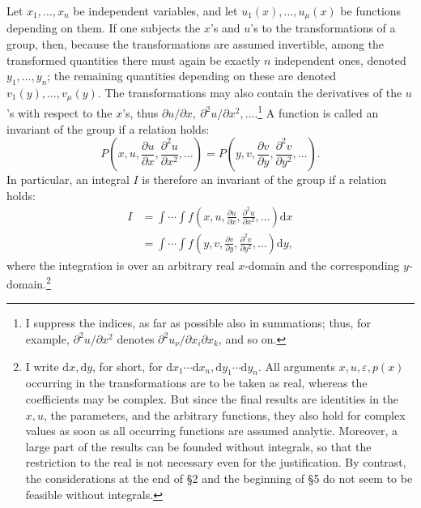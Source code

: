 \documentclass[11pt]{article}
\providecommand{\eps}{\varepsilon}
\providecommand{\dd}{\mathrm d}
\providecommand{\p}{\partial}
\begin{document}
Let \(x_1,\ldots,x_n\) be independent variables, and let \(u_1(x),\ldots,u_\mu(x)\) be functions depending on them. If one subjects the \(x\)'s and \(u\)'s to the transformations of a group, then, because the transformations are assumed invertible, among the transformed quantities there must again be exactly \(n\) independent ones, denoted \(y_1,\ldots,y_n\); the remaining quantities depending on these are denoted \(v_1(y),\ldots,v_\mu(y)\). The transformations may also contain the derivatives of the \(u\)'s with respect to the \(x\)'s, thus \(\p u/\p x,\ \p^2u/\p x^2,\ldots\).\footnote{I suppress the indices, as far as possible also in summations; thus, for example, \(\p^2u/\p x^2\) denotes \(\p^2u_\nu/\p x_i\p x_k\), and so on.} A function is called an invariant of the group if a relation holds:
\[
P\!\left(x,u,\frac{\p u}{\p x},\frac{\p^2u}{\p x^2},\ldots\right)
 =
P\!\left(y,v,\frac{\p v}{\p y},\frac{\p^2v}{\p y^2},\ldots\right).
\]
In particular, an integral \(I\) is therefore an invariant of the group if a relation holds:
\begin{equation}
\begin{aligned}
I&=\int\!\cdots\!\int f\!\left(x,u,\frac{\p u}{\p x},\frac{\p^2u}{\p x^2},\ldots\right)\dd x\\
 &=\int\!\cdots\!\int f\!\left(y,v,\frac{\p v}{\p y},\frac{\p^2v}{\p y^2},\ldots\right)\dd y,
\end{aligned}
\tag{1}
\end{equation}
where the integration is over an arbitrary real \(x\)-domain and the corresponding \(y\)-domain.\footnote{I write \(\dd x,\dd y\), for short, for \(\dd x_1\cdots \dd x_n,\dd y_1\cdots \dd y_n\). All arguments \(x,u,\eps,p(x)\) occurring in the transformations are to be taken as real, whereas the coefficients may be complex. But since the final results are identities in the \(x,u\), the parameters, and the arbitrary functions, they also hold for complex values as soon as all occurring functions are assumed analytic. Moreover, a large part of the results can be founded without integrals, so that the restriction to the real is not necessary even for the justification. By contrast, the considerations at the end of \S{}2 and the beginning of \S{}5 do not seem to be feasible without integrals.}
\end{document}
